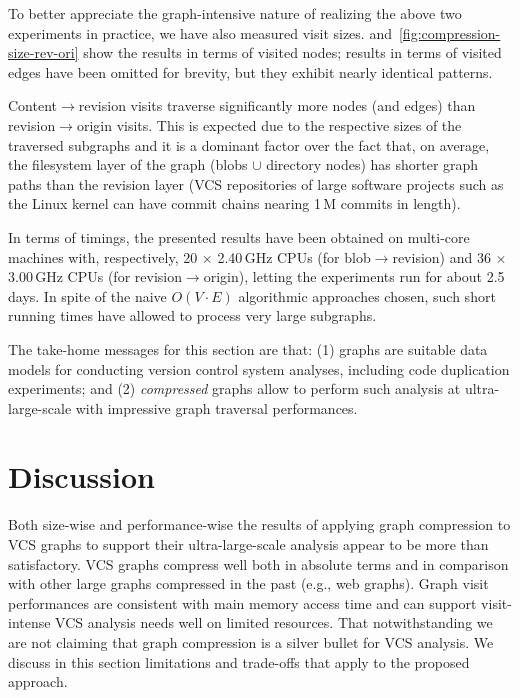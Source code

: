 \smallskip

To better appreciate the graph-intensive nature of realizing the above two
experiments in practice, we have also measured visit sizes.
 and~\ref{fig:compression-size-rev-ori}
show the results in terms of visited nodes; results in terms of visited edges
have been omitted for brevity, but they exhibit nearly identical patterns.

Content$\to$revision visits traverse significantly more nodes (and edges) than
revision$\to$origin visits. This is expected due to the respective sizes of the
traversed subgraphs and it is a dominant
factor over the fact that, on average, the filesystem layer of the graph
(blobs $\cup$ directory nodes) has shorter graph paths than the revision
layer (VCS repositories of large software projects such as the Linux kernel can
have commit chains nearing 1\,M commits in length).

\smallskip

In terms of timings, the presented results have been obtained on multi-core
machines with, respectively, 20 $\times$ 2.40\,GHz CPUs (for
blob$\to$revision) and 36 $\times$ 3.00\,GHz CPUs (for revision$\to$origin),
letting the experiments run for about 2.5 days. In spite of the naive $O(V\cdot
E)$ algorithmic approaches chosen, such short running times have allowed to
process very large subgraphs.

\smallskip

The take-home messages for this section are that: (1) graphs are suitable data
models for conducting version control system analyses, including code
duplication experiments; and (2) \emph{compressed} graphs allow to perform such
analysis at ultra-large-scale with impressive graph traversal performances.

\section{Discussion}%
\label{sec:compression-discussion}

Both size-wise and performance-wise the results of applying graph compression
to VCS graphs to support their ultra-large-scale analysis appear to be more
than satisfactory. VCS graphs compress well both in absolute terms and in
comparison with other large graphs compressed in the past (e.g., web graphs).
Graph visit performances are consistent with main memory access time and can
support visit-intense VCS analysis needs well on limited resources.
%
That notwithstanding we are not claiming that graph compression is a silver
bullet for VCS analysis. We discuss in this section limitations and trade-offs
that apply to the proposed approach.


